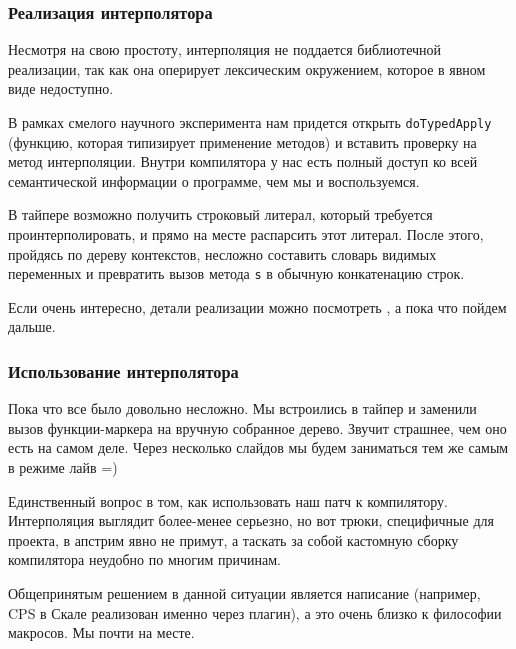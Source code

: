 \documentclass[hyperref={bookmarks=false}]{beamer}
\begin{document}
\begin{frame}[t,fragile]
\frametitle{Реализация интерполятора}

Несмотря на свою простоту, интерполяция не поддается библиотечной реализации, так как она оперирует лексическим окружением, которое в явном виде недоступно.

В рамках смелого научного эксперимента нам придется открыть \texttt{doTypedApply} (функцию, которая типизирует применение методов) и вставить проверку на метод интерполяции. Внутри компилятора у нас есть полный доступ ко всей семантической информации о программе, чем мы и воспользуемся.

В тайпере возможно получить строковый литерал, который требуется проинтерполировать, и прямо на месте распарсить этот литерал. После этого, пройдясь по дереву контекстов, несложно составить словарь видимых переменных и превратить вызов метода \texttt{s} в обычную конкатенацию строк.

Если очень интересно, детали реализации можно посмотреть , а пока что пойдем дальше.
\end{frame}

\begin{frame}[t,fragile]
\frametitle{Использование интерполятора}

Пока что все было довольно несложно. Мы встроились в тайпер и заменили вызов функции-маркера на вручную собранное дерево. Звучит страшнее, чем оно есть на самом деле. Через несколько слайдов мы будем заниматься тем же самым в режиме лайв =)

Единственный вопрос в том, как использовать наш патч к компилятору. Интерполяция выглядит более-менее серьезно, но вот трюки, специфичные для проекта, в апстрим явно не примут, а таскать за собой кастомную сборку компилятора неудобно по многим причинам.

Общепринятым решением в данной ситуации является написание  (например, CPS в Скале реализован именно через плагин), а это очень близко к философии макросов. Мы почти на месте.
\end{frame}
\end{document}
